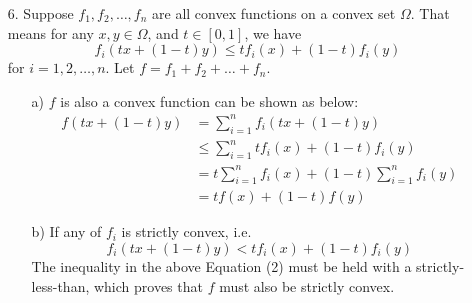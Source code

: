 \documentclass{article}
\begin{document}
\begin{enumerate}
        \item[6. ] Suppose $f_1, f_2, \dots, f_n$ are all convex functions on a convex set $\Omega$.
        That means for any $x,y \in \Omega$, and $t \in [0,1]$, we have
        $$ f_i(tx + (1-t)y)  \leq tf_i(x) + (1-t)f_i(y) $$
        for $i = 1,2,\dots,n$. Let $f = f_1 + f_2 + \dots + f_n$.
        
        \begin{enumerate}
            \item[a)] $f$ is also a convex function can be shown as below:
                \begin{align}
                    f(tx + (1-t)y) &=    \sum_{i=1}^{n} f_i( tx + (1-t)y ) \\
                                   &\leq \sum_{i=1}^{n} tf_i(x) + (1-t)f_i(y) \\
                                   &= t \sum_{i=1}^{n} f_i(x) + (1-t) \sum_{i=1}^{n} f_i(y) \\
                                   &= t f(x) + (1-t) f(y)
                \end{align}
        
            \item[b)] If any of $f_i$ is strictly convex, i.e.
            $$ f_i(tx + (1-t)y)  < tf_i(x) + (1-t)f_i(y) $$
            The inequality in the above Equation (2) must be held with a strictly-less-than, 
            which proves that $f$ must also be strictly convex.\\
            
        \end{enumerate}
        
        
\end{enumerate}
\end{document}
